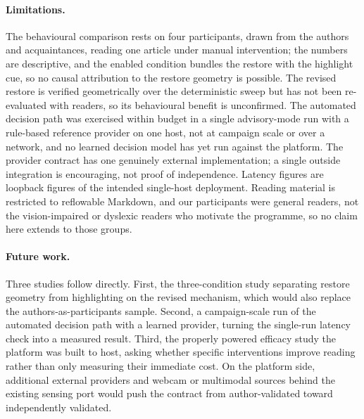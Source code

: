 \paragraph{Limitations.}
The behavioural comparison rests on four participants, drawn from the authors and acquaintances, reading one article under manual intervention; the numbers are descriptive, and the enabled condition bundles the restore with the highlight cue, so no causal attribution to the restore geometry is possible.
The revised restore is verified geometrically over the deterministic sweep but has not been re-evaluated with readers, so its behavioural benefit is unconfirmed.
The automated decision path was exercised within budget in a single advisory-mode run with a rule-based reference provider on one host, not at campaign scale or over a network, and no learned decision model has yet run against the platform.
The provider contract has one genuinely external implementation; a single outside integration is encouraging, not proof of independence.
Latency figures are loopback figures of the intended single-host deployment.
Reading material is restricted to reflowable Markdown, and our participants were general readers, not the vision-impaired or dyslexic readers who motivate the programme, so no claim here extends to those groups.

\paragraph{Future work.}
Three studies follow directly.
First, the three-condition study separating restore geometry from highlighting on the revised mechanism, which would also replace the authors-as-participants sample.
Second, a campaign-scale run of the automated decision path with a learned provider, turning the single-run latency check into a measured result.
Third, the properly powered efficacy study the platform was built to host, asking whether specific interventions improve reading rather than only measuring their immediate cost.
On the platform side, additional external providers and webcam or multimodal sources behind the existing sensing port would push the contract from author-validated toward independently validated.
